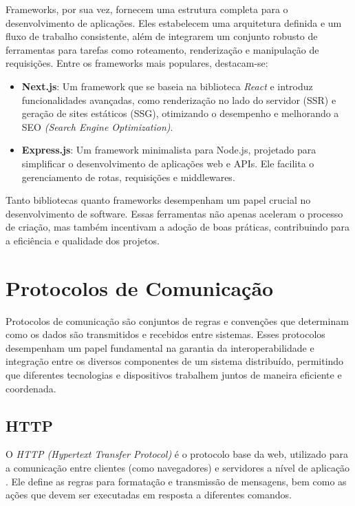 Frameworks, por sua vez, fornecem uma estrutura completa para o desenvolvimento de aplicações. Eles estabelecem uma arquitetura definida e um fluxo de trabalho consistente, além de integrarem um conjunto robusto de ferramentas para tarefas como roteamento, renderização e manipulação de requisições. Entre os frameworks mais populares, destacam-se:
\begin{itemize}
    \item \textbf{Next.js}: Um framework que se baseia na biblioteca \emph{React} \cite{what-is-nextjs} e introduz funcionalidades avançadas, como renderização no lado do servidor (SSR) e geração de sites estáticos (SSG), otimizando o desempenho e melhorando a SEO \emph{(Search Engine Optimization)}.
    \item \textbf{Express.js}: Um framework minimalista para Node.js, projetado para simplificar o desenvolvimento de aplicações web e APIs. Ele facilita o gerenciamento de rotas, requisições e middlewares.
\end{itemize}

Tanto bibliotecas quanto frameworks desempenham um papel crucial no desenvolvimento de software. Essas ferramentas não apenas aceleram o processo de criação, mas também incentivam a adoção de boas práticas, contribuindo para a eficiência e qualidade dos projetos.


\section{Protocolos de Comunicação}

Protocolos de comunicação são conjuntos de regras e convenções que determinam como os dados são transmitidos e recebidos entre sistemas. Esses protocolos desempenham um papel fundamental na garantia da interoperabilidade e integração entre os diversos componentes de um sistema distribuído, permitindo que diferentes tecnologias e dispositivos trabalhem juntos de maneira eficiente e coordenada.

\subsection{HTTP}

O \emph{HTTP (Hypertext Transfer Protocol)} é o protocolo base da web, utilizado para a comunicação entre clientes (como navegadores) e servidores a nível de aplicação \cite{http-protocol}. Ele define as regras para formatação e transmissão de mensagens, bem como as ações que devem ser executadas em resposta a diferentes comandos.

